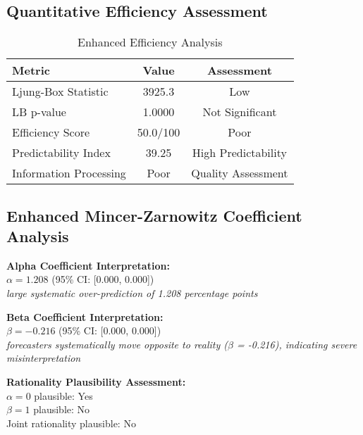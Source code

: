 \documentclass[11pt,a4paper]{article}
\begin{document}
\subsection{Quantitative Efficiency Assessment}
\begin{table}[H]
  \centering
  \caption{Enhanced Efficiency Analysis}
  \begin{tabular}{lcc}
    \toprule
    \textbf{Metric}        & \textbf{Value} & \textbf{Assessment} \\
    \midrule
    Ljung-Box Statistic    & 3925.3         & Low                 \\
    LB p-value             & 1.0000         & Not Significant     \\
    Efficiency Score       & 50.0/100       & Poor                \\
    Predictability Index   & 39.25          & High Predictability \\
    Information Processing & Poor           & Quality Assessment  \\
    \bottomrule
  \end{tabular}
\end{table}

\subsection{Enhanced Mincer-Zarnowitz Coefficient Analysis}
\textbf{Alpha Coefficient Interpretation:}\\
$\alpha = 1.208$ (95\% CI: [0.000, 0.000])\\
\textit{large systematic over-prediction of 1.208 percentage points}

\textbf{Beta Coefficient Interpretation:}\\
$\beta = -0.216$ (95\% CI: [0.000, 0.000])\\
\textit{forecasters systematically move opposite to reality ($\beta$ = -0.216), indicating severe misinterpretation}

\textbf{Rationality Plausibility Assessment:}\\
$\alpha = 0$ plausible: Yes\\
$\beta = 1$ plausible: No\\
Joint rationality plausible: No
\end{document}
